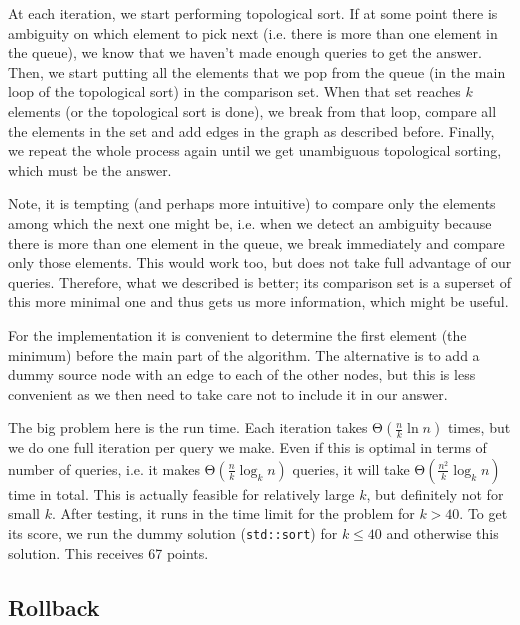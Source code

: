 \documentclass{article}
\begin{document}
At each iteration, we start performing topological sort. If at some point there is ambiguity on which element to pick next (i.e. there is more than one element in the queue), we know that we haven't made enough queries to get the answer. Then, we start putting all the elements that we pop from the queue (in the main loop of the topological sort) in the comparison set. When that set reaches $ k $ elements (or the topological sort is done), we break from that loop, compare all the elements in the set and add edges in the graph as described before. Finally, we repeat the whole process again until we get unambiguous topological sorting, which must be the answer.

Note, it is tempting (and perhaps more intuitive) to compare only the elements among which the next one might be, i.e. when we detect an ambiguity because there is more than one element in the queue, we break immediately and compare only those elements. This would work too, but does not take full advantage of our queries. Therefore, what we described is better; its comparison set is a superset of this more minimal one and thus gets us more information, which might be useful.

For the implementation it is convenient to determine the first element (the minimum) before the main part of the algorithm. The alternative is to add a dummy source node with an edge to each of the other nodes, but this is less convenient as we then need to take care not to include it in our answer.

The big problem here is the run time. Each iteration takes $ \mathrm{\Theta}\left( \frac{n}{k} \ln{n} \right) $ times, but we do one full iteration per query we make. Even if this is optimal in terms of number of queries, i.e. it makes $ \mathrm{\Theta}\left( \frac{n}{k} \log_k{n} \right) $ queries, it will take $ \mathrm{\Theta}\left( \frac{n^2}{k} \log_k{n} \right) $ time in total. This is actually feasible for relatively large $k$, but definitely not for small $k$. After testing, it runs in the time limit for the problem for $ k > 40 $. To get its score, we run the dummy solution (\verb|std::sort|) for $ k \le 40 $ and otherwise this solution. This receives 67 points.

\subsection{Rollback}
\end{document}
